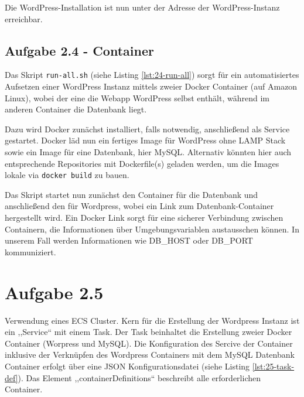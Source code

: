 \documentclass[a4paper]{scrartcl}
\begin{document}
Die WordPress-Installation ist nun unter der Adresse der WordPress-Instanz erreichbar.


\subsection*{Aufgabe 2.4 - Container}

Das Skript \texttt{run-all.sh} (siehe Listing \ref{lst:24-run-all}) sorgt für ein automatisiertes Aufsetzen einer WordPress Instanz mittels zweier Docker Container (auf Amazon Linux), wobei der eine die Webapp WordPress selbst enthält, während im anderen Container die Datenbank liegt.

Dazu wird Docker zunächst installiert, falls notwendig, anschließend als Service gestartet. Docker läd nun ein fertiges Image für WordPress ohne LAMP Stack sowie ein Image für eine Datenbank, hier MySQL. Alternativ könnten hier auch entsprechende Repositories mit Dockerfile(s) geladen werden, um die Images lokale via \texttt{docker build} zu bauen.

Das Skript startet nun zunächst den Container für die Datenbank und anschließend den für Wordpress, wobei ein Link zum Datenbank-Container hergestellt wird. Ein Docker Link sorgt für eine sicherer Verbindung zwischen Containern, die Informationen über Umgebungsvariablen austausschen können. In unserem Fall werden Informationen wie DB\_HOST oder DB\_PORT kommuniziert.

\section*{Aufgabe 2.5}
Verwendung eines ECS Cluster. Kern f\"ur die Erstellung der Wordpress Instanz ist ein ,,Service`` mit einem Task. Der Task beinhaltet die Erstellung zweier Docker Container (Worpress und MySQL). Die Konfiguration des Sercive der Container inklusive der Verkn\"upfen des Wordpress Containers mit dem MySQL Datenbank Container erfolgt \"uber eine JSON Konfigurationsdatei (siehe Listing \ref{lst:25-task-def}). Das Element ,,containerDefinitions`` beschreibt alle  erforderlichen Container.

\end{document}
